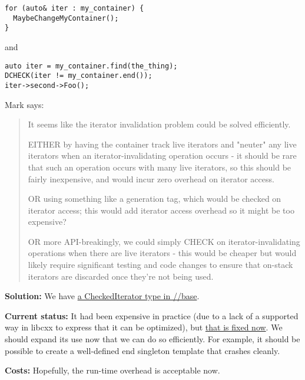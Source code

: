\documentclass[a4paper,12pt,notitlepage,twoside,openright]{article}
\begin{document}
{\begin{verbatim}
for (auto& iter : my_container) {
  MaybeChangeMyContainer();
}
\end{verbatim}

and

\begin{verbatim}
auto iter = my_container.find(the_thing);
DCHECK(iter != my_container.end());
iter->second->Foo();
\end{verbatim}

Mark says:

\begin{quote}
It seems like the iterator invalidation problem could be solved
efficiently.

EITHER by having the container track live iterators and "neuter" any
live iterators when an iterator-invalidating operation occurs - it
should be rare that such an operation occurs with many live iterators,
so this should be fairly inexpensive, and would incur zero overhead on
iterator access.

OR using something like a generation tag, which would be checked on
iterator access; this would add iterator access overhead so it might be
too expensive?

OR more API-breakingly, we could simply CHECK on iterator-invalidating
operations when there are live iterators - this would be cheaper but
would likely require significant testing and code changes to ensure that
on-stack iterators are discarded once they're not being used.
\end{quote}

\textbf{Solution:} We
have \href{https://www.google.com/url?q=https://source.chromium.org/chromium/chromium/src/\%2B/master:base/containers/checked_iterators.h\&sa=D\&source=editors\&ust=1631944129057000\&usg=AOvVaw13QYLercw7YJFR6fuENUX8}{a CheckedIterator type
in //base}.

\textbf{Current status:} It had been expensive in practice (due to a
lack of a supported way in libcxx to express that it can be optimized),
but \href{https://www.google.com/url?q=https://bugs.chromium.org/p/chromium/issues/detail?id\%3D994174\%23c15\&sa=D\&source=editors\&ust=1631944129058000\&usg=AOvVaw30V7RnIENr3gQFMdSLCPVt}{that
is fixed now}. We should expand its use now that we can do so
efficiently. For example, it should be possible to create a
well-defined end singleton template that crashes cleanly.

\textbf{Costs:} Hopefully, the run-time overhead is acceptable now.

}
\end{document}

